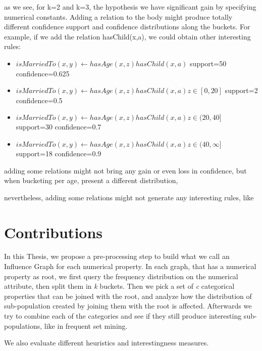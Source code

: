 as we see, for k=2 and k=3, the hypothesis we have significant gain by specifying numerical constants. Adding a relation to the body might produce totally different confidence support and confidence distributions along the buckets. For example, if we add the relation hasChild(x,a), we could obtain other interesting rules:
\begin{itemize}
 \item \begin{math}isMarriedTo(x,y) \leftarrow hasAge(x,z)hasChild(x,a)\end{math}			support=50 	confidence=0.625
 \item \begin{math}isMarriedTo(x,y) \leftarrow hasAge(x,z)hasChild(x,a)z\in[0,20]\end{math}		support=2 	confidence=0.5
 \item \begin{math}isMarriedTo(x,y) \leftarrow hasAge(x,z)hasChild(x,a)z\in(20,40]\end{math}	support=30 	confidence=0.7
 \item \begin{math}isMarriedTo(x,y) \leftarrow hasAge(x,z)hasChild(x,a)z\in(40,\infty]\end{math}	support=18 	confidence=0.9
\end{itemize}

adding some relations might not bring any gain or even loss in confidence, but when bucketing per age, present a different distribution, 

nevertheless, adding some relations might not generate any interesting rules, like 


\section{Contributions}
In this Thesis, we propose a pre-processing step to build what we call an Influence Graph for each numerical property. In each graph, that has a numerical property as root, we first query the frequency distribution on the numerical attribute, then split them in \emph{k} buckets. Then we pick a set of \emph{c} categorical properties that can be joined with the root, and analyze how the distribution of sub-population created by joining them with the root is affected. Afterwards we try to combine each of the categories and see if they still produce interesting sub-populations, like in frequent set mining.

We also evaluate different heuristics and interestingness measures.

